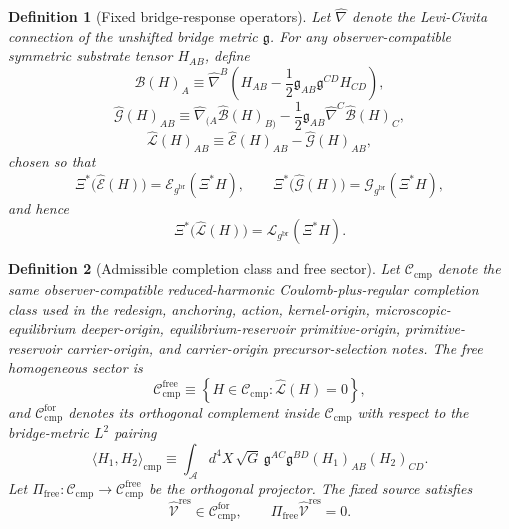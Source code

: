 \documentclass[11pt]{article}
\newcommand{\Sub}{\mathcal A}
\newcommand{\ObserverMap}{\Xi}
\newcommand{\BridgeMetric}{\mathfrak g}
\newcommand{\ObserverMetric}{g^{\mathrm{br}}}
\newcommand{\ResidualLift}{\widehat{\mathcal V}^{\mathrm{res}}}
\newcommand{\SubEinLin}{\widehat{\mathcal E}}
\newcommand{\SubGaugeVec}{\widehat{\mathcal B}}
\newcommand{\SubGaugeBook}{\widehat{\mathcal G}}
\newcommand{\SubReducedEin}{\widehat{\mathcal L}}
\newcommand{\FreeProj}{\Pi_{\mathrm{free}}}
\newcommand{\ReducedEin}{\mathcal L_{\ObserverMetric}}
\newcommand{\GaugeBook}{\mathcal G_{\ObserverMetric}}
\newcommand{\EinLin}{\mathcal E_{\ObserverMetric}}
\newcommand{\CompClass}{\mathscr C_{\mathrm{cmp}}}
\newcommand{\CompFree}{\mathscr C_{\mathrm{cmp}}^{\mathrm{free}}}
\newcommand{\CompForced}{\mathscr C_{\mathrm{cmp}}^{\mathrm{for}}}
\newtheorem{definition}{Definition}
\begin{document}
\begin{definition}[Fixed bridge-response operators]
\label{def:operators}
Let \(\widehat\nabla\) denote the Levi-Civita connection of the unshifted bridge metric \(\BridgeMetric\). For any observer-compatible symmetric substrate tensor \(H_{AB}\), define
\begin{equation}
\SubGaugeVec(H)_A
\equiv
\widehat\nabla^B\!\left(
H_{AB}
-\frac12 \BridgeMetric_{AB}\BridgeMetric^{CD}H_{CD}
\right),
\label{eq:subB}
\end{equation}
\begin{equation}
\SubGaugeBook(H)_{AB}
\equiv
\widehat\nabla_{(A}\SubGaugeVec(H)_{B)}
-\frac12 \BridgeMetric_{AB}\widehat\nabla^C\SubGaugeVec(H)_C,
\label{eq:subG}
\end{equation}
\begin{equation}
\SubReducedEin(H)_{AB}
\equiv
\SubEinLin(H)_{AB}-\SubGaugeBook(H)_{AB},
\label{eq:subL}
\end{equation}
chosen so that
\begin{equation}
\ObserverMap^*\bigl(\SubEinLin(H)\bigr)=\EinLin(\ObserverMap^*H),
\qquad
\ObserverMap^*\bigl(\SubGaugeBook(H)\bigr)=\GaugeBook(\ObserverMap^*H),
\label{eq:intertwine1}
\end{equation}
and hence
\begin{equation}
\ObserverMap^*\bigl(\SubReducedEin(H)\bigr)
=
\ReducedEin(\ObserverMap^*H).
\label{eq:intertwine2}
\end{equation}
\end{definition}

\begin{definition}[Admissible completion class and free sector]
\label{def:class}
Let \(\CompClass\) denote the same observer-compatible reduced-harmonic Coulomb-plus-regular completion class used in the redesign, anchoring, action, kernel-origin, microscopic-equilibrium deeper-origin, equilibrium-reservoir primitive-origin, primitive-reservoir carrier-origin, and carrier-origin precursor-selection notes. The free homogeneous sector is
\begin{equation}
\CompFree
\equiv
\left\{
H\in\CompClass:\SubReducedEin(H)=0
\right\},
\label{eq:freeclass}
\end{equation}
and \(\CompForced\) denotes its orthogonal complement inside \(\CompClass\) with respect to the bridge-metric \(L^2\) pairing
\begin{equation}
\langle H_1,H_2\rangle_{\mathrm{cmp}}
\equiv
\int_{\Sub} d^4X\,\sqrt{G}\,
\BridgeMetric^{AC}\BridgeMetric^{BD}(H_1)_{AB}(H_2)_{CD}.
\label{eq:inner}
\end{equation}
Let \(\FreeProj:\CompClass\to\CompFree\) be the orthogonal projector. The fixed source satisfies
\begin{equation}
\ResidualLift\in\CompForced,
\qquad
\FreeProj\ResidualLift=0.
\label{eq:sourcefree}
\end{equation}
\end{definition}
\end{document}
